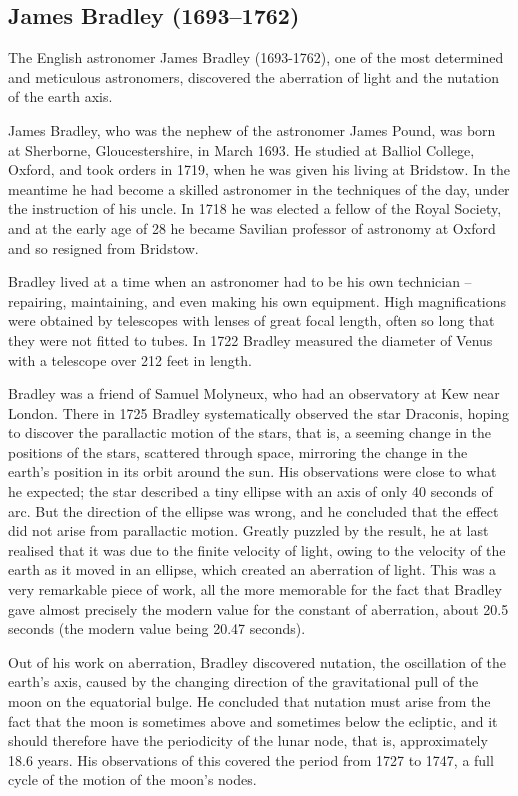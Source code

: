 \subsection[James \scshape{Bradley}]{James Bradley (1693--1762)}\label{bio:bradley}
The English astronomer James Bradley (1693-1762), one of the most determined and meticulous astronomers, discovered the aberration of light and the nutation of the earth axis.

James Bradley, who was the nephew of the astronomer James Pound, was born at Sherborne, Gloucestershire, in March 1693. He studied at Balliol College, Oxford, and took orders in 1719, when he was given his living at Bridstow. In the meantime he had become a skilled astronomer in the techniques of the day, under the instruction of his uncle. In 1718 he was elected a fellow of the Royal Society, and at the early age of 28 he became Savilian professor of astronomy at Oxford and so resigned from Bridstow.

Bradley lived at a time when an astronomer had to be his own technician --repairing, maintaining, and even making his own equipment. High magnifications were obtained by telescopes with lenses of great focal length, often so long that they were not fitted to tubes. In 1722 Bradley measured the diameter of Venus with a telescope over 212 feet in length.

Bradley was a friend of Samuel Molyneux, who had an observatory at Kew near London. There in 1725 Bradley systematically observed the star Draconis, hoping to discover the parallactic motion of the stars, that is, a seeming change in the positions of the stars, scattered through space, mirroring the change in the earth's position in its orbit around the sun. His observations were close to what he expected; the star described a tiny ellipse with an axis of only 40 seconds of arc. But the direction of the ellipse was wrong, and he concluded that the effect did not arise from parallactic motion. Greatly puzzled by the result, he at last realised that it was due to the finite velocity of light, owing to the velocity of the earth as it moved in an ellipse, which created an aberration of light. This was a very remarkable piece of work, all the more memorable for the fact that Bradley gave almost precisely the modern value for the constant of aberration, about 20.5 seconds (the modern value being 20.47 seconds).

Out of his work on aberration, Bradley discovered nutation, the oscillation of the earth's axis, caused by the changing direction of the gravitational pull of the moon on the equatorial bulge. He concluded that nutation must arise from the fact that the moon is sometimes above and sometimes below the ecliptic, and it should therefore have the periodicity of the lunar node, that is, approximately 18.6 years. His observations of this covered the period from 1727 to 1747, a full cycle of the motion of the moon's nodes.

